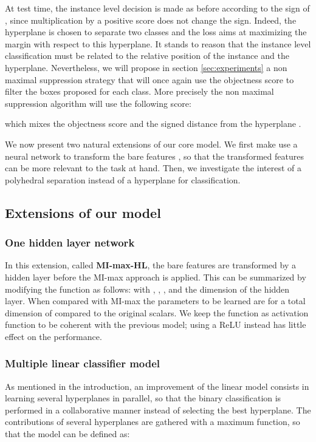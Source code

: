 \documentclass[preprint]{elsarticle}
\newcommand\MILS{MI-max}
\newcommand\mimaxaddlayerS{MI-max-HL}
\begin{document}
At test time, the instance level decision is made as before according to the sign of , since multiplication by a positive score does not change the sign. Indeed, the hyperplane  is chosen to separate two classes and the loss  aims at maximizing the margin with respect to this hyperplane. It stands to reason that the instance level classification must be related to the relative position of the instance and the hyperplane. Nevertheless, we will propose in section \ref{sec:experiments} a non maximal suppression strategy that will once again use the objectness score to filter the boxes proposed for each class. More precisely the non maximal suppression algorithm will use the following score:


which mixes the objectness score  and the signed distance from the hyperplane .


We now present two natural extensions of our core model. We first make use a neural network to transform the bare features , so that the transformed features can be more relevant to the task at hand. Then, we investigate the interest of a polyhedral separation instead of a hyperplane for classification. 

\subsection{Extensions of our model}

\subsubsection{One hidden layer network}

 In this extension, called \textbf{\mimaxaddlayerS{}}, the bare features  are transformed by a hidden layer before the \MILS{} approach is applied. This can be summarized by modifying the function  as follows:
   with , , ,  and  the dimension of the hidden layer. When compared with \MILS{} the parameters to be learned are  for a total dimension of  compared to the original  scalars. 
We keep the function  as activation function to be coherent with the previous model; using a ReLU instead has little effect on the performance.


\subsubsection{Multiple linear classifier model}

As mentioned in the introduction, an improvement of  the linear model consists in learning several hyperplanes in parallel, so that the binary classification is performed in a collaborative manner instead of selecting the best hyperplane. The contributions of several hyperplanes are gathered with a maximum function, so that the model can be defined as: 
\end{document}
